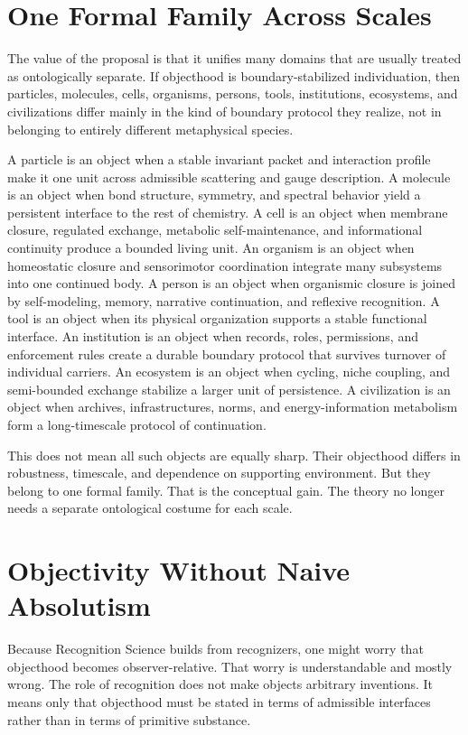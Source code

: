 \documentclass[11pt]{article}
\begin{document}
\section{One Formal Family Across Scales}

The value of the proposal is that it unifies many domains that are usually treated as ontologically separate.
If objecthood is boundary-stabilized individuation, then particles, molecules, cells, organisms, persons, tools, institutions, ecosystems, and civilizations differ mainly in the kind of boundary protocol they realize, not in belonging to entirely different metaphysical species.

A particle is an object when a stable invariant packet and interaction profile make it one unit across admissible scattering and gauge description.
A molecule is an object when bond structure, symmetry, and spectral behavior yield a persistent interface to the rest of chemistry.
A cell is an object when membrane closure, regulated exchange, metabolic self-maintenance, and informational continuity produce a bounded living unit.
An organism is an object when homeostatic closure and sensorimotor coordination integrate many subsystems into one continued body.
A person is an object when organismic closure is joined by self-modeling, memory, narrative continuation, and reflexive recognition.
A tool is an object when its physical organization supports a stable functional interface.
An institution is an object when records, roles, permissions, and enforcement rules create a durable boundary protocol that survives turnover of individual carriers.
An ecosystem is an object when cycling, niche coupling, and semi-bounded exchange stabilize a larger unit of persistence.
A civilization is an object when archives, infrastructures, norms, and energy-information metabolism form a long-timescale protocol of continuation.

This does not mean all such objects are equally sharp.
Their objecthood differs in robustness, timescale, and dependence on supporting environment.
But they belong to one formal family.
That is the conceptual gain.
The theory no longer needs a separate ontological costume for each scale.

\section{Objectivity Without Naive Absolutism}

Because Recognition Science builds from recognizers, one might worry that objecthood becomes observer-relative.
That worry is understandable and mostly wrong.
The role of recognition does not make objects arbitrary inventions.
It means only that objecthood must be stated in terms of admissible interfaces rather than in terms of primitive substance.
\end{document}
